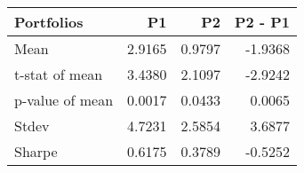 \begin{tabular}{lrrr}
\toprule
Portfolios & P1 & P2 & P2 - P1 \\
\midrule
Mean & 2.9165 & 0.9797 & -1.9368 \\
t-stat of mean & 3.4380 & 2.1097 & -2.9242 \\
p-value of mean & 0.0017 & 0.0433 & 0.0065 \\
Stdev & 4.7231 & 2.5854 & 3.6877 \\
Sharpe & 0.6175 & 0.3789 & -0.5252 \\
\bottomrule
\end{tabular}

